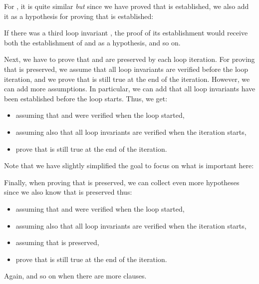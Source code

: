 

For , it is quite similar \emph{but} since we have proved that
 is established, we also add it as a hypothesis for proving that
 is established:




If there was a third loop invariant , the proof of its
establishment would receive both the establishment of  and
 as a hypothesis, and so on.


Next, we have to prove that  and  are preserved by
each loop iteration. For proving that  is preserved, we assume
that all loop invariants are verified before the loop iteration, and we prove
that  is still true at the end of the iteration. However, we can
add more assumptions. In particular, we can add that all loop invariants have
been established before the loop starts. Thus, we get:
\begin{itemize}
  \item assuming that  and  were verified when the
        loop started,
  \item assuming also that all loop invariants are verified when the iteration
        starts,
  \item prove that  is still true at the end of the iteration.
\end{itemize}
Note that we have slightly simplified the goal to focus on what is important
here:




Finally, when proving that  is preserved, we can collect even
more hypotheses since we also know that  is preserved thus:
\begin{itemize}
  \item assuming that  and  were verified when the
        loop started,
  \item assuming also that all loop invariants are verified when the iteration
        starts,
  \item assuming that  is preserved,
  \item prove that  is still true at the end of the iteration.
\end{itemize}
Again, and so on when there are more  clauses.


